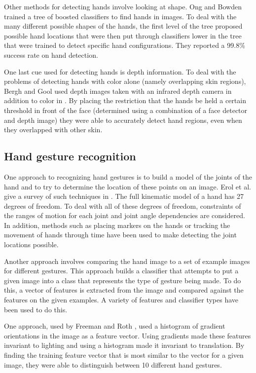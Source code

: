 \documentclass[10pt,twocolumn,letterpaper]{article}
\begin{document}
Other methods for detecting hands involve looking at shape. Ong and Bowden \cite{ong2004boosted} trained a tree of boosted classifiers to find hands in images. To deal with the many different possible shapes of the hands, the first level of the tree proposed possible hand locations that were then put through classifiers lower in the tree that were trained to detect specific hand configurations. They reported a 99.8\% success rate on hand detection.

One last cue used for detecting hands is depth information. To deal with the problems of detecting hands with color alone (namely overlapping skin regions), Bergh and Gool used depth images taken with an infrared depth camera in addition to color in \cite{van2011combining}. By placing the restriction that the hands be held a certain threshold in front of the face (determined using a combination of a face detector and depth image) they were able to accurately detect hand regions, even when they overlapped with other skin.

\subsection{Hand gesture recognition}

One approach to recognizing hand gestures is to build a model of the joints of the hand and to try to determine the location of these points on an image. Erol et al. give a survey of such techniques in \cite{erol2007vision}. The full kinematic model of a hand has 27 degrees of freedom. To deal with all of these degrees of freedom, constraints of the ranges of motion for each joint and joint angle dependencies are considered. In addition, methods such as placing markers on the hands or tracking the movement of hands through time have been used to make detecting the joint locations possible.

Another approach involves comparing the hand image to a set of example images for different gestures. This approach builds a classifier that attempts to put a given image into a class that represents the type of gesture being made. To do this, a vector of features is extracted from the image and compared against the features on the given examples. A variety of features and classifier types have been used to do this.

One approach, used by Freeman and Roth \cite{freeman1995orientation}, used a histogram of gradient orientations in the image as a feature vector. Using gradients made these features invariant to lighting and using a histogram made it invariant to translation. By finding the training feature vector that is most similar to the vector for a given image, they were able to distinguish between 10 different hand gestures.
\end{document}
